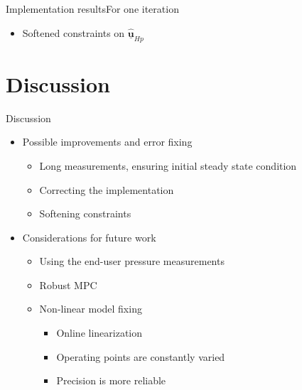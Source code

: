\begin{frame}{Implementation results}{For one iteration}

\begin{itemize}
	 	\item<1-> Softened constraints on $\hat{\pmb{\underline{u}}}_{Hp}$
	 	\end{itemize}

\begin{figure}[H]
   \centering
    
\end{figure}

\end{frame}


\section{Discussion}
\begin{frame}{Discussion}{}

\begin{itemize}
	\item<1-> Possible improvements and error fixing
	\begin{itemize}
	 \item<1-> Long measurements, ensuring initial steady state condition
	 \item<1-> Correcting the implementation
	 \item<1-> Softening constraints

	\end{itemize}
\end{itemize}

\begin{itemize}
\item<2-> Considerations for future work
	 \begin{itemize}
	 \item<2-> Using the end-user pressure measurements
	 \item<2-> Robust MPC
	 \item<2-> Non-linear model fixing

		\begin{itemize}
	 	\item<3-> Online linearization
	 	\item<3-> Operating points are constantly varied
	 	\item<3-> Precision is more reliable
	 	\end{itemize}

	 \end{itemize}
\end{itemize}

\end{frame}
